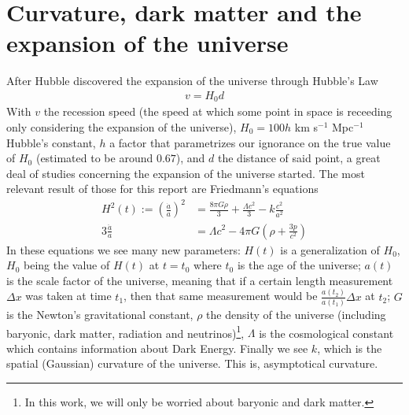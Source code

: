 \section{Curvature, dark matter and the expansion of the universe}
After Hubble discovered the expansion of the universe through Hubble's Law\cite{Hubble1929}
\begin{align}
	v = H_0 d
	\label{eq:ley-hubble}
\end{align}
With $v$ the recession speed (the speed at which some point in space is receeding only considering the expansion of the universe), $H_0=100h$ km s$^{-1}$ Mpc$^{-1}$ Hubble's constant, $h$ a factor that parametrizes our ignorance on the true value of $H_0$ (estimated to be around $0.67$), and $d$ the distance of said point, a great deal of studies concerning the expansion of the universe started. The most relevant result of those for this report are Friedmann's equations \\
\begin{align}
	H^2(t) := \left(\frac{\dot a}{a}\right)^2 &=  \frac{8\pi G \rho}{3} +\frac{\Lambda c^2}{3} - k \frac{c^2}{a^2}
	\label{eq:1a-friedmann}\\
	3 \frac{\ddot a}{a} &= \Lambda c^2 - 4\pi G \left( \rho + \frac{3p}{c^2} \right) 
	\label{eq:2a-friedmann}
\end{align}
In these equations we see many new parameters: $H(t)$ is a generalization of $H_0$, $H_0$ being the value of $H(t)$ at $t=t_0$ where $t_0$ is the age of the universe; $a(t)$ is the scale factor of the universe, meaning that if a certain length measurement $\Delta x$ was taken at time $t_1$, then that same measurement would be $\frac{a(t_2)}{a(t_1)}\Delta x$ at $t_2$; $G$ is the Newton's gravitational constant, $\rho$ the density of the universe (including baryonic, dark matter, radiation and neutrinos)\footnote{In this work, we will only be worried about baryonic and dark matter.}, $\Lambda$ is the cosmological constant which contains information about Dark Energy. Finally we see $k$, which is the spatial (Gaussian) curvature of the universe. This is, asymptotical curvature. \\

